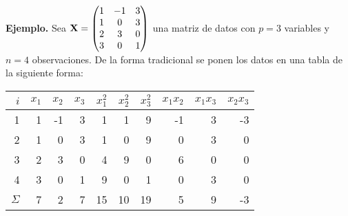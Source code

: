 \begin{frame}
\textbf{Ejemplo.}
Sea $\mathbf{X}=\begin{pmatrix}
1&-1&3\\
1&0&3\\
2&3&0\\
3&0&1
\end{pmatrix}$
una matriz de datos con $p=3$ variables y $n=4$ observaciones.
De la forma tradicional  se ponen los datos en una tabla de la siguiente forma:

\begin{center}
\begin{tabular}{|r||r|r|r|r|r|r|r|r|r|}
\hline
$i$&$x_1$&$x_2$&$x_3$&$x_1^2$&$x_2^2$&$x_3^2$&$x_1x_2$&$x_1x_3$&$x_2x_3$
\\\hline\hline
1&1&-1&3&1&1&9&-1&3&-3\\
2&1&0&3&1&0&9&0&3&0\\
3&2&3&0&4&9&0&6&0&0\\
4&3&0&1&9&0&1&0&3&0\\\hline
$\Sigma$&7&2&7&15&10&19&5&9&-3\\\hline
\end{tabular}
\end{center}

\end{frame}


